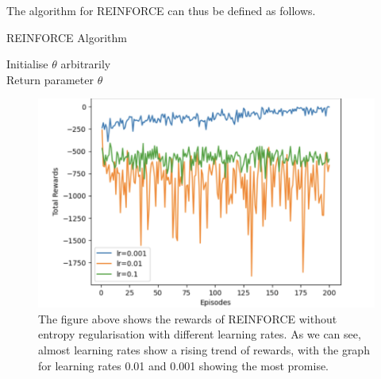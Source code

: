 \documentclass{article}
\begin{document}
The algorithm for REINFORCE can thus be defined as follows. 
\begin{algorithm}[htbp]
\caption{REINFORCE Algorithm}
\SetAlgoLined
\DontPrintSemicolon
\small %
Initialise $\theta$ arbitrarily\;\\
Return parameter $\theta$
\end{algorithm}

\begin{figure}[htbp]
\centering
\includegraphics[width=0.9\linewidth]{Report/images/reinforce_basic_image1.png}
\caption{\label{fig:Reinforce Rewards}The figure above shows the rewards of REINFORCE without entropy regularisation with different learning rates. As we can see, almost learning rates show a rising trend of rewards, with the graph for learning rates 0.01 and 0.001 showing the most promise. }
\end{figure}
\end{document}
